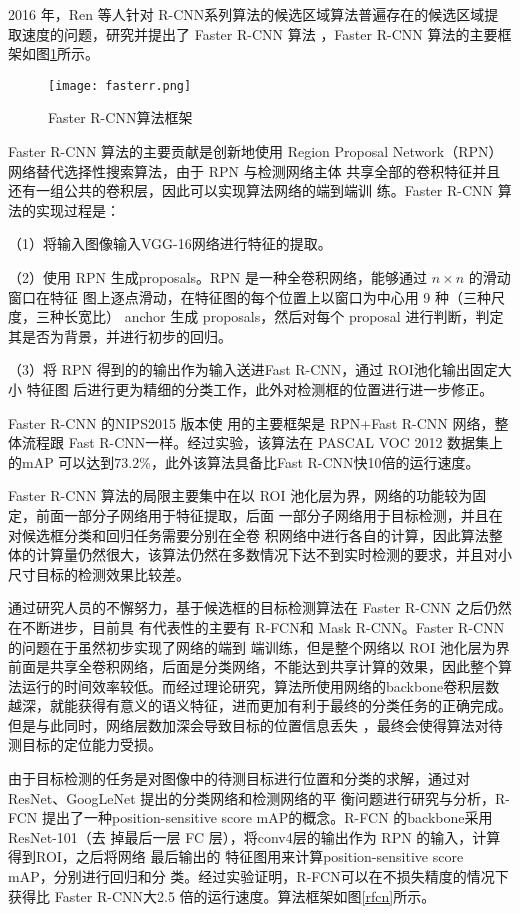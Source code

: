 2016 年，Ren 等人针对 R-CNN系列算法的候选区域算法普遍存在的候选区域提取速度的问题，研究并提出了 Faster R-CNN 算法
\cite{ren2015faster}，Faster R-CNN 算法的主要框架如图\ref{fasterr}所示。

\begin{figure}[htbp]
    \centering
    \texttt{[image: fasterr.png]}
    \caption{Faster R-CNN算法框架}
    \label{fasterr}
\end{figure}

Faster R-CNN 算法的主要贡献是创新地使用 Region
Proposal Network（RPN）网络替代选择性搜索算法，由于 RPN 与检测网络主体
共享全部的卷积特征并且还有一组公共的卷积层，因此可以实现算法网络的端到端训
练。Faster R-CNN 算法的实现过程是：

（1）将输入图像输入VGG-16网络进行特征的提取。

（2）使用 RPN 生成proposals。RPN 是一种全卷积网络，能够通过 $n \times n$ 的滑动窗口在特征
图上逐点滑动，在特征图的每个位置上以窗口为中心用 9 种（三种尺度，三种长宽比）
anchor 生成 proposals，然后对每个 proposal 进行判断，判定其是否为背景，并进行初步的回归。

（3）将 RPN 得到的的输出作为输入送进Fast R-CNN，通过 ROI池化输出固定大小 特征图 后进行更为精细的分类工作，此外对检测框的位置进行进一步修正。

Faster R-CNN 的NIPS2015 版本使
用的主要框架是 RPN+Fast R-CNN 网络，整体流程跟 Fast R-CNN一样。经过实验，该算法在 PASCAL VOC 2012 数据集上的mAP 可以达到$73.2\%$，此外该算法具备比Fast R-CNN快10倍的运行速度。

Faster R-CNN 算法的局限主要集中在以 ROI 池化层为界，网络的功能较为固定，前面一部分子网络用于特征提取，后面
一部分子网络用于目标检测，并且在对候选框分类和回归任务需要分别在全卷
积网络中进行各自的计算，因此算法整体的计算量仍然很大，该算法仍然在多数情况下达不到实时检测的要求，并且对小尺寸目标的检测效果比较差。

通过研究人员的不懈努力，基于候选框的目标检测算法在 Faster R-CNN 之后仍然在不断进步，目前具
有代表性的主要有 R-FCN\cite{dai2016r}和 Mask R-CNN\cite{he2017mask}。Faster R-CNN 的问题在于虽然初步实现了网络的端到
端训练，但是整个网络以 ROI 池化层为界前面是共享全卷积网络，后面是分类网络，不能达到共享计算的效果，因此整个算
法运行的时间效率较低。而经过理论研究，算法所使用网络的backbone卷积层数越深，就能获得有意义的语义特征，进而更加有利于最终的分类任务的正确完成。但是与此同时，网络层数加深会导致目标的位置信息丢失
，最终会使得算法对待测目标的定位能力受损。

由于目标检测的任务是对图像中的待测目标进行位置和分类的求解，通过对ResNet、GoogLeNet
提出的分类网络和检测网络的平
衡问题进行研究与分析，R-FCN 提出了一种position-sensitive score mAP的概念。R-FCN 的backbone采用ResNet-101（去
掉最后一层 FC 层），将conv4层的输出作为 RPN 的输入，计算得到ROI，之后将网络
最后输出的 特征图用来计算position-sensitive score mAP，分别进行回归和分
类。经过实验证明，R-FCN可以在不损失精度的情况下获得比 Faster R-CNN大2.5 倍的运行速度。算法框架如图\ref{rfcn}所示。

